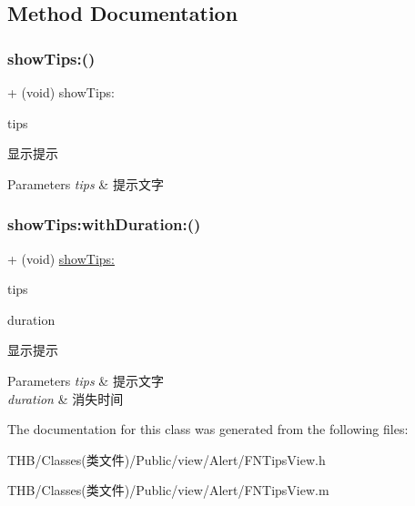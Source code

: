 \subsection{Method Documentation}
\mbox{\label{interface_f_n_tips_view_aaec0cc2cb74e097445d9c3efa66c597a}} 
\subsubsection{\texorpdfstring{show\+Tips\+:()}{showTips:()}}
{\footnotesize\ttfamily + (void) show\+Tips\+: \begin{DoxyParamCaption}\item[{(N\+S\+String $\ast$)}]{tips }\end{DoxyParamCaption}}

显示提示


\begin{DoxyParams}{Parameters}
{\em tips} & 提示文字 \\
\hline
\end{DoxyParams}
\mbox{\label{interface_f_n_tips_view_ae67392c99f4502a7f480426538475bfc}} 
\subsubsection{\texorpdfstring{show\+Tips\+:with\+Duration\+:()}{showTips:withDuration:()}}
{\footnotesize\ttfamily + (void) \mbox{\hyperlink{interface_f_n_tips_view_aaec0cc2cb74e097445d9c3efa66c597a}{show\+Tips\+:}} \begin{DoxyParamCaption}\item[{(N\+S\+String $\ast$)}]{tips }\item[{withDuration:(C\+G\+Float)}]{duration }\end{DoxyParamCaption}}

显示提示


\begin{DoxyParams}{Parameters}
{\em tips} & 提示文字 \\
\hline
{\em duration} & 消失时间 \\
\hline
\end{DoxyParams}


The documentation for this class was generated from the following files\+:\begin{DoxyCompactItemize}
\item 
T\+H\+B/\+Classes(类文件)/\+Public/view/\+Alert/F\+N\+Tips\+View.\+h\item 
T\+H\+B/\+Classes(类文件)/\+Public/view/\+Alert/F\+N\+Tips\+View.\+m\end{DoxyCompactItemize}

